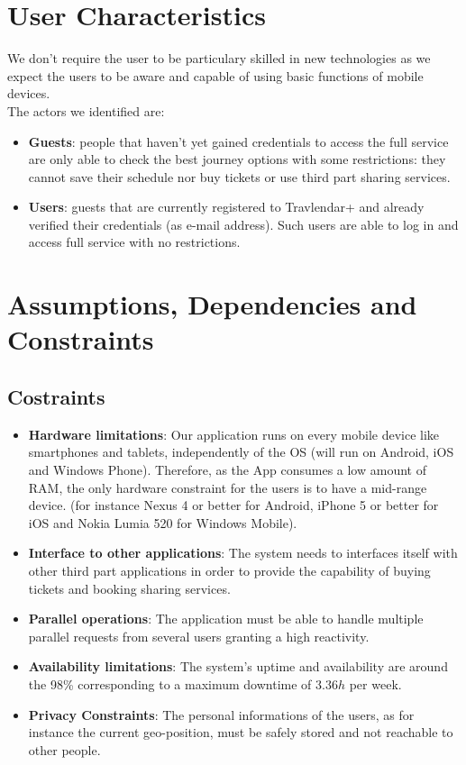 \documentclass[numbers=noenddot, 12pt, a4paper, oneside]{scrbook}
\begin{document}
\section{User Characteristics}


We don't require the user to be particulary skilled in new technologies as we expect the users to be aware and capable of using basic functions of mobile devices.\\

The actors we identified are:
\begin{itemize}
	\item \textbf{Guests}: people that haven't yet gained credentials to access the full service are only able to check the best journey options with some restrictions: they cannot save their schedule nor buy tickets or use third part sharing services.
	\item \textbf{Users}: guests that are currently registered to Travlendar+ and already verified their credentials (as e-mail address). Such users are able to log in and access full service with no restrictions.
\end{itemize}
\section{Assumptions, Dependencies and Constraints\\}

\subsection*{Costraints}

\begin{itemize}
	\item \textbf{Hardware limitations}: Our application runs on every mobile device like smartphones and tablets, independently of the OS (will run on Android, iOS and Windows Phone). Therefore, as the App consumes a low amount of RAM, the only hardware constraint for the users is to have a mid-range device. (for instance Nexus 4 or better for Android, iPhone 5 or better for iOS and Nokia Lumia 520 for Windows Mobile).
	\item \textbf{Interface to other applications}: The system needs to interfaces itself with other third part applications in order to provide the capability of buying tickets and booking sharing services.
	\item \textbf{Parallel operations}: The application must be able to handle multiple parallel requests from several users granting a high reactivity.
	\item \textbf{Availability limitations}: The system's uptime and availability are around the 98\% corresponding to a maximum downtime of $3.36h$ per week.
	\item \textbf{Privacy Constraints}: The personal informations of the users, as for instance the current geo-position, must be safely stored and not reachable to other people.
\end{itemize}
\end{document}
